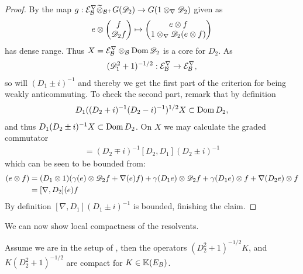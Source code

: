 \begin{proof}
	By  the map $g:\mathcal{E}_{\mathcal{B}}^\nabla\widetilde{\otimes}_{\mathcal{B}^+} G(\mathscr{D}_2)\to G(1\otimes_\nabla \mathscr{D}_2)$ given as 
	\begin{align*}
		e\otimes \begin{pmatrix} f \\ \mathscr{D}_2 f\end{pmatrix} \mapsto \begin{pmatrix} e\otimes f  \\ 1\otimes_\nabla \mathscr{D}_2(e\otimes f) \end{pmatrix}
	\end{align*}
	has dense range. Thus $X=\mathcal{E}_{\mathcal{B}}^\nabla \otimes_{\mathcal{B}} \operatorname{Dom} \mathscr{D}_2$ is a core for $D_2$. As \begin{align*} (\mathscr{D}_1^2+1)^{-1/2}: \mathcal{E}_{\mathcal{B}}^\nabla \to \mathcal{E}_{\mathcal{B}}^\nabla, \end{align*} so will $(D_1\pm i)^{-1}$ and thereby we get the first part of the criterion for being weakly anticommuting. 
	To check the second part, remark that by definition \begin{align*} D_1((D_2+i)^{-1}(D_2-i)^{-1})^{1/2}X\subset \operatorname{Dom} D_2, \end{align*} and thus $D_1(D_2\pm i)^{-1} X\subset \operatorname{Dom} D_2$. On $X$ we may calculate the graded commutator 
	\begin{align*}
		[D_1,(D_2\pm i)^{-1}]=(D_2\mp i)^{-1}[D_2,D_1](D_2\pm i)^{-1}
	\end{align*}
	which can be seen to be bounded from: 
	\begin{align*}
		[D_2,D_1](e\tens f)&=(D_1\tens 1)(\gamma(e)\tens \D_2 f+\nabla(e)f)+\gamma(D_1e)\tens \D_2 f+\gamma(D_1e)\tens f+\nabla(D_2 e)\tens f\\
		&=[\nabla,D_2](e)f
	\end{align*}
	By definition $[\nabla,D_1](D_1\pm i)^{-1}$ is bounded, finishing the claim. 
\end{proof}
We can now show local compactness of the resolvents. 
\begin{lemma}\label{mesrennie43}
	Assume we are in the setup of , then the operators $(D_2^2+1)^{-1/2}K$, and $K(D_2^2+1)^{-1/2}$ are compact for $K\in \mathbb{K}(E_B)$. 
\end{lemma}

